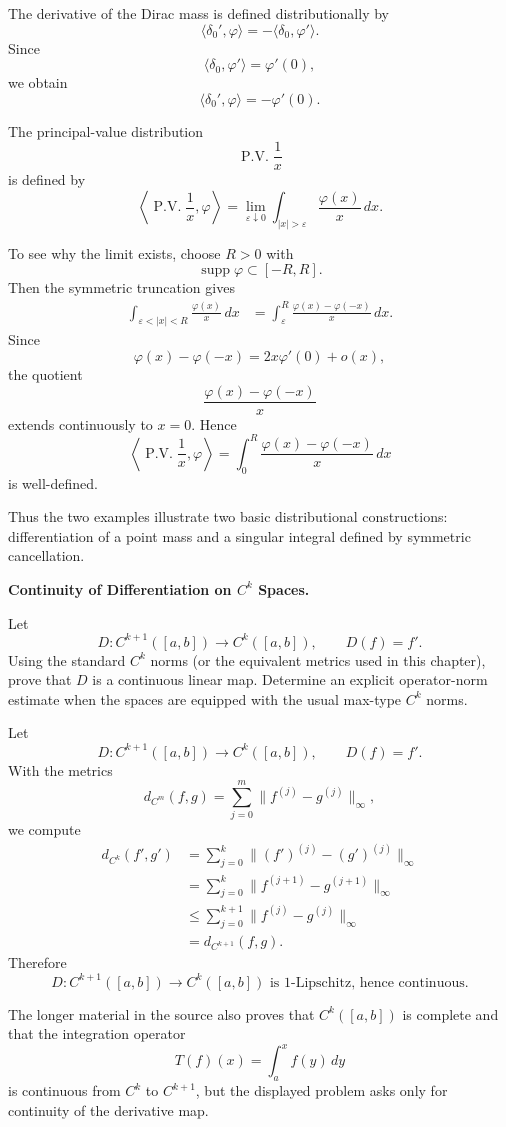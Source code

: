 \begin{solution}
The derivative of the Dirac mass is defined distributionally by
\[
\langle \delta_0',\varphi\rangle
=
-\langle\delta_0,\varphi'\rangle.
\]
Since
\[
\langle\delta_0,\varphi'\rangle=\varphi'(0),
\]
we obtain
\[
\boxed{
\langle\delta_0',\varphi\rangle=-\varphi'(0).
}
\]

The principal-value distribution
\[
\operatorname{P.V.}\frac1x
\]
is defined by
\[
\left\langle
\operatorname{P.V.}\frac1x,\varphi
\right\rangle
=
\lim_{\varepsilon\downarrow0}
\int_{|x|>\varepsilon}
\frac{\varphi(x)}x\,dx.
\]

To see why the limit exists, choose \(R>0\) with
\[
\operatorname{supp}\varphi\subset[-R,R].
\]
Then the symmetric truncation gives
\[
\begin{aligned}
\int_{\varepsilon<|x|<R}
\frac{\varphi(x)}x\,dx
&=
\int_\varepsilon^R
\frac{\varphi(x)-\varphi(-x)}x\,dx.
\end{aligned}
\]
Since
\[
\varphi(x)-\varphi(-x)
=
2x\varphi'(0)+o(x),
\]
the quotient
\[
\frac{\varphi(x)-\varphi(-x)}x
\]
extends continuously to \(x=0\). Hence
\[
\boxed{
\left\langle
\operatorname{P.V.}\frac1x,\varphi
\right\rangle
=
\int_0^R
\frac{\varphi(x)-\varphi(-x)}x\,dx
}
\]
is well-defined.

Thus the two examples illustrate two basic distributional constructions:
differentiation of a point mass and a singular integral defined by symmetric cancellation.
\end{solution}


\begin{problem}[CP-II-0565]
\label{prob:cp-ii-0565}
\textbf{Continuity of Differentiation on \(C^k\) Spaces.}

\hspace*{1.5em}Let
\[
D:C^{k+1}([a,b])\to C^k([a,b]),
\qquad
D(f)=f'.
\]
Using the standard \(C^k\) norms (or the equivalent metrics used in this
chapter), prove that \(D\) is a continuous linear map. Determine an explicit
operator-norm estimate when the spaces are equipped with the usual max-type
\(C^k\) norms.
\end{problem}

\begin{solution}
Let
\[
D:C^{k+1}([a,b])\to C^k([a,b]),
\qquad
D(f)=f'.
\]
With the metrics
\[
d_{C^m}(f,g)
=
\sum_{j=0}^{m}
\|f^{(j)}-g^{(j)}\|_\infty,
\]
we compute
\[
\begin{aligned}
d_{C^k}(f',g')
&=
\sum_{j=0}^{k}
\|(f')^{(j)}-(g')^{(j)}\|_\infty\\
&=
\sum_{j=0}^{k}
\|f^{(j+1)}-g^{(j+1)}\|_\infty\\
&\le
\sum_{j=0}^{k+1}
\|f^{(j)}-g^{(j)}\|_\infty\\
&=
d_{C^{k+1}}(f,g).
\end{aligned}
\]
Therefore
\[
\boxed{
D:C^{k+1}([a,b])\to C^k([a,b])
\text{ is }1\text{-Lipschitz, hence continuous}.
}
\]

The longer material in the source also proves that \(C^k([a,b])\) is complete and that the
integration operator
\[
T(f)(x)=\int_a^x f(y)\,dy
\]
is continuous from \(C^k\) to \(C^{k+1}\), but the displayed problem asks only for continuity
of the derivative map.
\end{solution}


